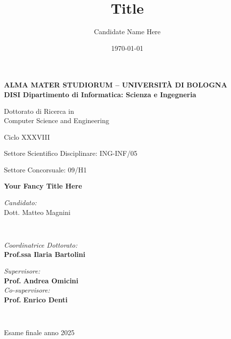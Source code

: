 \title{Title}
\author{Candidate Name Here}
\date{\today}

\begin{titlepage}
	\begin{center}

		\large
		\textbf{ALMA MATER STUDIORUM -- UNIVERSITÀ DI BOLOGNA \\ DISI Dipartimento di Informatica: Scienza e Ingegneria}
		\\
		\noindent\hrulefill
		\vspace{0.4cm}

		\Large
		Dottorato di Ricerca in \\
		Computer Science and Engineering

		\vspace{0.4cm}

		Ciclo XXXVIII

		\vspace{0.4cm}

		Settore Scientifico Disciplinare: ING-INF/05

		Settore Concorsuale: 09/H1

		\Huge
		\vspace{3cm}
		\textbf{
			Your Fancy Title Here
		}

		{\Large{
		\vspace{3cm}

		\textit{Candidato:\\}
		\centering
		Dott. Matteo Magnini}
		\\}
		\large
		\vspace{2.5cm}
		\begin{minipage}[t]{0.64\textwidth}
			\begin{flushleft}
				\textit{Coordinatrice Dottorato:}
				\\
				\textbf{Prof.ssa Ilaria Bartolini}
			\end{flushleft}
		\end{minipage}
		\begin{minipage}[t]{0.34\textwidth}
			\begin{flushright}
				\textit{Supervisore:}
				\\
				\textbf{Prof.} \textbf{Andrea Omicini}
				\\
				\vspace{0.4cm}
				\textit{Co-supervisore:}
				\\
				\textbf{Prof.} \textbf{Enrico Denti}
			\end{flushright}

		\end{minipage}\\

		\vfill
		\noindent\hrulefill
		\vspace{0.3cm}
		\Large

		Esame finale anno 2025
	\end{center}
\end{titlepage}
\restoregeometry